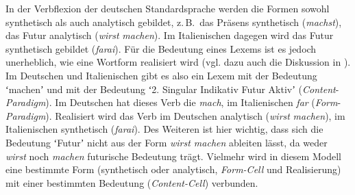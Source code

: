 In der Verbflexion der deutschen Standardsprache werden die Formen sowohl synthetisch als auch analytisch gebildet, z.\,B.\ das Präsens synthetisch (\textit{machst}), das Futur analytisch (\textit{wirst} \textit{machen}). Im Italienischen dagegen wird das Futur synthetisch gebildet (\textit{farai}). Für die Bedeutung eines Lexems ist es jedoch unerheblich, wie eine Wortform realisiert wird (vgl. dazu auch die Diskussion in ). Im Deutschen und Italienischen gibt es also ein Lexem mit der Bedeutung ʻmachenʼ und mit der Bedeutung ʻ2. Singular Indikativ Futur Aktivʼ (\textit{Content}{}-\textit{Paradigm}). Im Deutschen hat dieses Verb die  \textit{mach}, im Italienischen \textit{far} (\textit{Form}{}-\textit{Paradigm}). Realisiert wird das Verb im Deutschen analytisch (\textit{wirst} \textit{machen}), im Italienischen synthetisch (\textit{farai}). Des Weiteren ist hier wichtig, dass sich die Bedeutung ʻFuturʼ nicht aus der Form \textit{wirst machen} ableiten lässt, da weder \textit{wirst} noch \textit{machen} futurische Bedeutung trägt. Vielmehr wird in diesem Modell eine bestimmte Form (synthetisch oder analytisch, \textit{Form-Cell} und Realisierung) mit einer bestimmten Bedeutung (\textit{Content-Cell}) verbunden.



